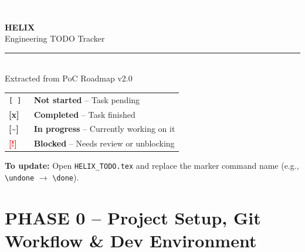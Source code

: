 \documentclass[11pt,a4paper]{article}
\newcommand{\undone}{\textcolor{helixgray}{\texttt{[ ] }}}
\newcommand{\done}{\textcolor{helixteal}{\textbf{[x] }}}
\newcommand{\progress}{\textcolor{helixpurplemid}{\textbf{[\textasciitilde] }}}
\newcommand{\blocked}{\textcolor{red}{\textbf{[!] }}}
\newcommand{\filepath}[1]{\texttt{\small#1}}
\begin{document}

\noindent\colorbox{helixpurple}{%
    \parbox{\dimexpr\textwidth+2\fboxsep\relax}{%
        \vspace{6pt}
        \hspace{8pt}\textcolor{white}{\small\scshape{PoC Engineering TODO Tracker}}
        \vspace{6pt}
    }%
}
\vspace{1.5cm}
\begin{center}
    {\fontsize{40}{48}\selectfont\bfseries\color{helixpurple} HELIX}\\[6pt]
    {\Large\color{textsecondary}Engineering TODO Tracker}\\[4pt]
    \color{helixborder}\rule{0.5\textwidth}{0.5pt}\\[16pt]
    {\normalsize\color{textsecondary}Extracted from PoC Roadmap v2.0}
\end{center}
\vspace{1cm}

\begin{summarybox}[title=How to Track]
\begin{tabular}{C{2.5cm} L{12cm}}
    \toprule
    \undone & \textbf{Not started} -- Task pending \\
    \done   & \textbf{Completed} -- Task finished \\
    \progress & \textbf{In progress} -- Currently working on it \\
    \blocked & \textbf{Blocked} -- Needs review or unblocking \\
    \bottomrule
\end{tabular}
\vspace{6pt}
\textbf{To update:} Open \filepath{HELIX\_TODO.tex} and replace the marker command name (e.g., \texttt{\textbackslash undone} $\rightarrow$ \texttt{\textbackslash done}).
\end{summarybox}

\vspace{1cm}

\section{PHASE 0 -- Project Setup, Git Workflow \& Dev Environment}
\end{document}
